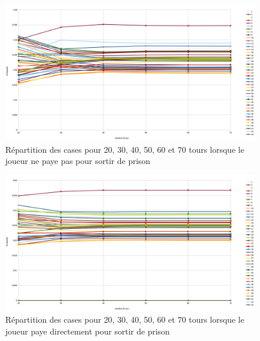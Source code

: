 \documentclass[letterpaper]{article}
\begin{document}
\begin{center}
	  \begin{figure}[bp!]
	    \includegraphics[scale=0.4]{./Images/GraphRepPayePas20-70.png}
	    \caption{\label{graph_all_result_paye_pas} Répartition des cases pour 20, 30, 40, 50, 60 et 70 tours lorsque le joueur ne paye pas pour sortir de prison}
	  \end{figure}
	  
	  \begin{figure}[bp!]
	    \includegraphics[scale=0.4]{./Images/GraphRepPaye20-70.png}
	    \caption{\label{graph_all_result_paye} Répartition des cases pour 20, 30, 40, 50, 60 et 70 tours lorsque le joueur paye directement pour sortir de prison}
	  \end{figure}
	\end{center}
    \newpage
    
\end{document}
